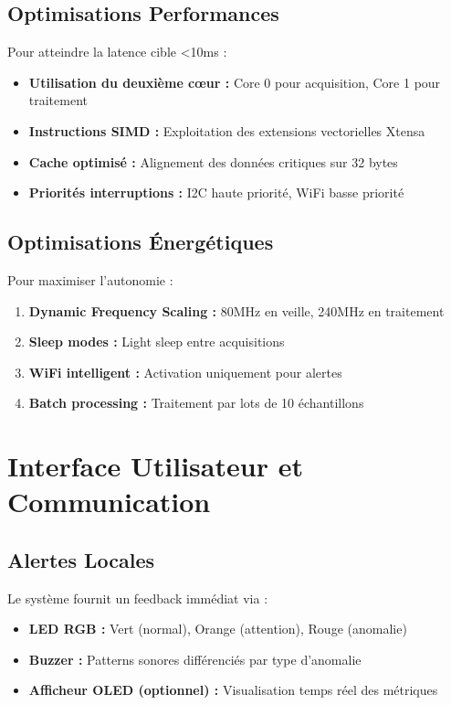 \subsection{Optimisations Performances}

Pour atteindre la latence cible <10ms :

\begin{itemize}
    \item \textbf{Utilisation du deuxième cœur :} Core 0 pour acquisition, Core 1 pour traitement
    \item \textbf{Instructions SIMD :} Exploitation des extensions vectorielles Xtensa
    \item \textbf{Cache optimisé :} Alignement des données critiques sur 32 bytes
    \item \textbf{Priorités interruptions :} I2C haute priorité, WiFi basse priorité
\end{itemize}

\subsection{Optimisations Énergétiques}

Pour maximiser l'autonomie :

\begin{enumerate}
    \item \textbf{Dynamic Frequency Scaling :} 80MHz en veille, 240MHz en traitement
    \item \textbf{Sleep modes :} Light sleep entre acquisitions
    \item \textbf{WiFi intelligent :} Activation uniquement pour alertes
    \item \textbf{Batch processing :} Traitement par lots de 10 échantillons
\end{enumerate}

\section{Interface Utilisateur et Communication}

\subsection{Alertes Locales}

Le système fournit un feedback immédiat via :

\begin{itemize}
    \item \textbf{LED RGB :} Vert (normal), Orange (attention), Rouge (anomalie)
    \item \textbf{Buzzer :} Patterns sonores différenciés par type d'anomalie
    \item \textbf{Afficheur OLED (optionnel) :} Visualisation temps réel des métriques
\end{itemize}

